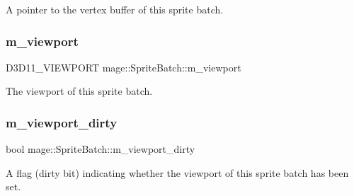 A pointer to the vertex buffer of this sprite batch. \hypertarget{classmage_1_1_sprite_batch_a3029ab1ee01ccfc69fef88eb78d5bfc0}{}\label{classmage_1_1_sprite_batch_a3029ab1ee01ccfc69fef88eb78d5bfc0} 
\subsubsection{\texorpdfstring{m\+\_\+viewport}{m\_viewport}}
{\footnotesize\ttfamily D3\+D11\+\_\+\+V\+I\+E\+W\+P\+O\+RT mage\+::\+Sprite\+Batch\+::m\+\_\+viewport\hspace{0.3cm}{\ttfamily [private]}}

The viewport of this sprite batch. \hypertarget{classmage_1_1_sprite_batch_a36c02637431746043ed6549c9b622550}{}\label{classmage_1_1_sprite_batch_a36c02637431746043ed6549c9b622550} 
\subsubsection{\texorpdfstring{m\+\_\+viewport\+\_\+dirty}{m\_viewport\_dirty}}
{\footnotesize\ttfamily bool mage\+::\+Sprite\+Batch\+::m\+\_\+viewport\+\_\+dirty\hspace{0.3cm}{\ttfamily [private]}}

A flag (dirty bit) indicating whether the viewport of this sprite batch has been set. 